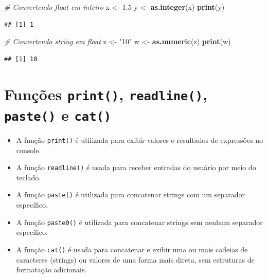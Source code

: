 \documentclass[
]{book}
\newenvironment{Shaded}{\begin{snugshade}}{\end{snugshade}}
\newcommand{\CommentTok}[1]{\textcolor[rgb]{0.56,0.35,0.01}{\textit{#1}}}
\newcommand{\FloatTok}[1]{\textcolor[rgb]{0.00,0.00,0.81}{#1}}
\newcommand{\FunctionTok}[1]{\textcolor[rgb]{0.13,0.29,0.53}{\textbf{#1}}}
\newcommand{\NormalTok}[1]{#1}
\newcommand{\OtherTok}[1]{\textcolor[rgb]{0.56,0.35,0.01}{#1}}
\newcommand{\StringTok}[1]{\textcolor[rgb]{0.31,0.60,0.02}{#1}}
\theoremstyle{definition}
\theoremstyle{definition}
\theoremstyle{definition}
\theoremstyle{definition}
\theoremstyle{remark}
\begin{document}
\begin{Shaded}
\begin{Highlighting}[]
\CommentTok{\# Convertendo float em inteiro}
\NormalTok{x }\OtherTok{\textless{}{-}} \FloatTok{1.5}
\NormalTok{y }\OtherTok{\textless{}{-}} \FunctionTok{as.integer}\NormalTok{(x)}
\FunctionTok{print}\NormalTok{(y)}
\end{Highlighting}
\end{Shaded}

\begin{verbatim}
## [1] 1
\end{verbatim}

\begin{Shaded}
\begin{Highlighting}[]
\CommentTok{\# Convertendo string em float}
\NormalTok{z }\OtherTok{\textless{}{-}} \StringTok{"10"}
\NormalTok{w }\OtherTok{\textless{}{-}} \FunctionTok{as.numeric}\NormalTok{(z)}
\FunctionTok{print}\NormalTok{(w)}
\end{Highlighting}
\end{Shaded}

\begin{verbatim}
## [1] 10
\end{verbatim}

\section{\texorpdfstring{Funções \texttt{print()}, \texttt{readline()}, \texttt{paste()} e \texttt{cat()}}{Funções print(), readline(), paste() e cat()}}\label{funuxe7uxf5es-print-readline-paste-e-cat}

\begin{itemize}
\item
  A função \texttt{print()} é utilizada para exibir valores e resultados de expressões no console.
\item
  A função \texttt{readline()} é usada para receber entradas do usuário por meio do teclado.
\item
  A função \texttt{paste()} é utilizada para concatenar strings com um separador específico.
\item
  A função \texttt{paste0()} é utilizada para concatenar strings sem nenhum separador específico.
\item
  A função \texttt{cat()} é usada para concatenar e exibir uma ou mais cadeias de caracteres (strings) ou valores de uma forma mais direta, sem estruturas de formatação adicionais.
\end{itemize}
\end{document}
